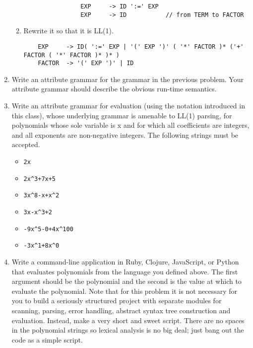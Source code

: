 \documentclass{article}
\begin{document}
\begin{enumerate}
\begin{enumerate}
            \begin{verbatim}
                EXP     -> ID ':=' EXP
                EXP     -> ID           // from TERM to FACTOR
            \end{verbatim}
            \item Rewrite it so that it is LL(1).
\begin{verbatim}
    EXP     -> ID( ':=' EXP | '(' EXP ')' ( '*' FACTOR )* ('+' FACTOR ( '*' FACTOR )* )* )
    FACTOR  -> '(' EXP ')' | ID
\end{verbatim}
        \end{enumerate}
    \pagebreak
    \item Write an attribute grammar for the grammar in the previous problem. Your attribute grammar should describe the obvious run-time semantics.
        
    \pagebreak
    \item Write an attribute grammar for evaluation (using the notation introduced in this class), whose underlying grammar is amenable to LL(1) parsing, for polynomials whose sole variable is x and for which all coefficients are integers, and all exponents are non-negative integers. The following strings must be accepted.
        \begin{itemize}
            \item \begin{verbatim}2x\end{verbatim}
            \item \begin{verbatim}2x^3+7x+5\end{verbatim}
            \item \begin{verbatim}3x^8-x+x^2\end{verbatim}
            \item \begin{verbatim}3x-x^3+2\end{verbatim}
            \item \begin{verbatim}-9x^5-0+4x^100\end{verbatim}
            \item \begin{verbatim}-3x^1+8x^0\end{verbatim}
        \end{itemize}
        
    \pagebreak
    \item Write a command-line application in Ruby, Clojure, JavaScript, or Python that evaluates polynomials from the language you defined above. The first argument should be the polynomial and the second is the value at which to evaluate the polynomial. Note that for this problem it is not necessary for you to build a seriously structured project with separate modules for scanning, parsing, error handling, abstract syntax tree construction and evaluation. Instead, make a very short and sweet script. There are no spaces in the polynomial strings so lexical analysis is no big deal; just bang out the code as a simple script.
    
    \pagebreak
\end{enumerate}
\end{document}
